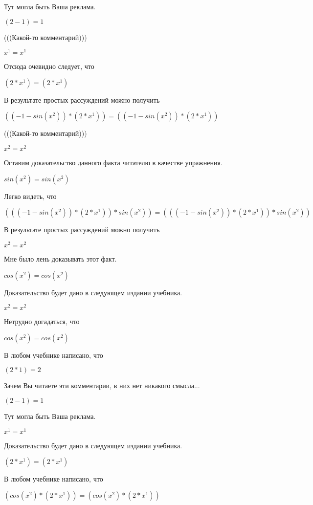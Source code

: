 \documentclass[12pt,a4paper,fleqn]{article}
\theoremstyle{definition}
\begin{document}
Тут могла быть Ваша реклама.

$( 2  -  1 ) =  1 $

(((Какой-то комментарий)))

${ x }^{ 1 } = { x }^{ 1 }$

Отсюда очевидно следует, что

$( 2  * { x }^{ 1 }) = ( 2  * { x }^{ 1 })$

В результате простых рассуждений можно получить

$(( -1  - sin({ x }^{ 2 })) * ( 2  * { x }^{ 1 })) = (( -1  - sin({ x }^{ 2 })) * ( 2  * { x }^{ 1 }))$

(((Какой-то комментарий)))

${ x }^{ 2 } = { x }^{ 2 }$

Оставим доказательство данного факта читателю в качестве упражнения.

$sin({ x }^{ 2 }) = sin({ x }^{ 2 })$

Легко видеть, что

$((( -1  - sin({ x }^{ 2 })) * ( 2  * { x }^{ 1 })) * sin({ x }^{ 2 })) = ((( -1  - sin({ x }^{ 2 })) * ( 2  * { x }^{ 1 })) * sin({ x }^{ 2 }))$

В результате простых рассуждений можно получить

${ x }^{ 2 } = { x }^{ 2 }$

Мне было лень доказывать этот факт.

$cos({ x }^{ 2 }) = cos({ x }^{ 2 })$

Доказательство будет дано в следующем издании учебника.

${ x }^{ 2 } = { x }^{ 2 }$

Нетрудно догадаться, что

$cos({ x }^{ 2 }) = cos({ x }^{ 2 })$

В любом учебнике написано, что

$( 2  *  1 ) =  2 $

Зачем Вы читаете эти комментарии, в них нет никакого смысла...

$( 2  -  1 ) =  1 $

Тут могла быть Ваша реклама.

${ x }^{ 1 } = { x }^{ 1 }$

Доказательство будет дано в следующем издании учебника.

$( 2  * { x }^{ 1 }) = ( 2  * { x }^{ 1 })$

В любом учебнике написано, что

$(cos({ x }^{ 2 }) * ( 2  * { x }^{ 1 })) = (cos({ x }^{ 2 }) * ( 2  * { x }^{ 1 }))$
\end{document}
